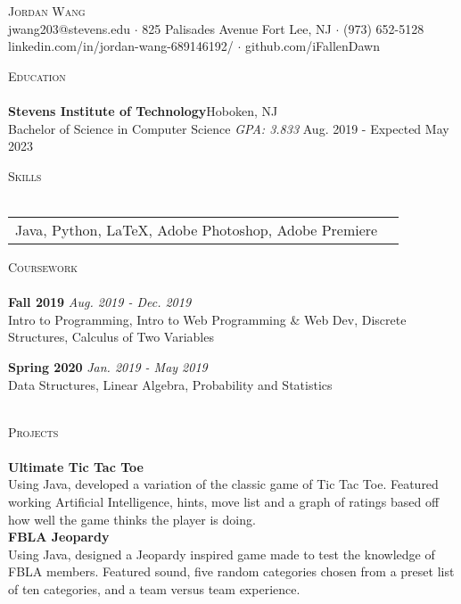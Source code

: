 \documentclass[11pt]{article}
\newcommand{\lineunder} {
    \vspace*{-8pt} \\
    \hspace*{-18pt} \hrulefill \\
}
\newcommand{\header} [1] {
    {\hspace*{-18pt}\vspace*{6pt} \textsc{#1}}
    \vspace*{-6pt} \lineunder
}
\begin{document}
\vspace*{-40pt}

    

\vspace*{2pt}
\begin{center}
	{\Huge \scshape {Jordan Wang}}\\
	jwang203@stevens.edu $\cdot$ 825 Palisades Avenue Fort Lee, NJ $\cdot$ (973) 652-5128 linkedin.com/in/jordan-wang-689146192/ $\cdot$ github.com/iFallenDawn \\
\end{center}

\header{Education}
\textbf{Stevens Institute of Technology}\hfill Hoboken, NJ\\
Bachelor of Science in Computer Science \textit{GPA: 3.833} \hfill Aug. 2019 - Expected May 2023\\
\vspace{2mm}

\header{Skills}
\begin{tabular}{ l l }
	Java, Python, \LaTeX, Adobe Photoshop, Adobe Premiere                    \\
\end{tabular}
\vspace{2mm}

\header{Coursework}
{\textbf{Fall 2019}} {\sl Aug. 2019 - Dec. 2019} \hfill 
\\
Intro to Programming, Intro to Web Programming \& Web Dev, Discrete Structures, Calculus of Two Variables\\
\vspace*{2mm}

{\textbf{Spring 2020}} {\sl Jan. 2019 - May 2019} \hfill 
\\
Data Structures, Linear Algebra, Probability and Statistics\\
\vspace*{2mm}
\ 

\header{Projects}
{\textbf{Ultimate Tic Tac Toe}} \hfill 
\\
Using Java, developed a variation of the classic game of Tic Tac Toe. Featured working Artificial Intelligence, hints, move list and a graph of ratings based off how well the game thinks the player is doing.\\
\vspace*{2mm}
{\textbf{FBLA Jeopardy}} \hfill 
\\
Using Java, designed a Jeopardy inspired game made to test the knowledge of FBLA members. Featured sound, five random categories chosen from a preset list of ten categories, and a team versus team experience.\\
\vspace*{2mm}
\ 
\end{document}

